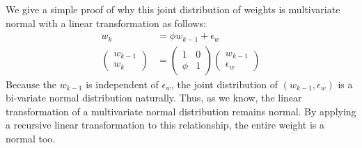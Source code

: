\documentclass{article}
\begin{document}
We give a simple proof of why this joint distribution of weights is multivariate normal with a linear transformation as follows:
$$\begin{aligned}
    w_k &= \phi w_{k-1}+\epsilon_w\\
    \begin{pmatrix}
        w_{k-1} \\
        w_k
    \end{pmatrix}&= 
    \begin{pmatrix}
        1 & 0\\
        \phi & 1
    \end{pmatrix}
    \begin{pmatrix}
        w_{k-1}\\
        \epsilon_w
    \end{pmatrix}
\end{aligned}$$
Because the $w_{k-1}$ is independent of $\epsilon_w$, the joint distribution of $(w_{k-1},\epsilon_w)$ is a bi-variate normal distribution naturally. Thus, as we know, the linear transformation of a multivariate normal distribution remains normal. By applying a recursive linear transformation to this relationship, the entire weight is a normal too.  
\end{document}
